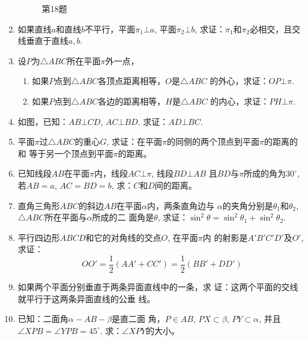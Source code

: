 \begin{enumerate}
\begin{figure}[htp]
\begin{minipage}[t]{0.48\textwidth}
\begin{tikzpicture}[>=latex, scale=1]
  \end{tikzpicture}
  \caption*{第18题}
  \end{minipage}
  \end{figure}

\item 如果直线$a$和直线$b$不平行，平面$\pi_1\bot a$, 平面$\pi_2\bot b$, 
求证：$\pi_1$和$\pi_2$必相交，且交线垂直于直线$a,b$.
\item 设$P$为$\triangle ABC$所在平面$\pi$外一点，
\begin{enumerate}
  \item 如果$P$点到$\triangle ABC$各顶点距离相等，$O$是$\triangle ABC$
的外心，求证：$OP\bot\pi$.
\item 如果$P$点到$\triangle ABC$各边的距离相等，$H$是$\triangle ABC$
的内心，求证：$PH\bot\pi$.
\end{enumerate}
\item 如图，已知：$AB\bot CD$, $AC\bot BD$. 
求证：$AD\bot BC$.
\item 平面$\pi$过$\triangle ABC$的重心$G$, 
求证：在平面$\pi$的同侧的两个顶点到平面$\pi$的距离的和
等于另一个顶点到平面$\pi$的距离。
\item 已知线段$AB$在平面$\pi$内，线段$AC\bot \pi$, 线段$BD\bot AB$
且$BD$与$\pi$所成的角为$30^{\circ}$, 若$AB=a$, $AC=BD=b$, 
求：$C$和$D$间的距离。
\item 直角三角形$ABC$的斜边$AB$在平面$\alpha$内，两条直角边与
$\alpha$的夹角分别是$\theta_1$和$\theta_2$, $\triangle ABC$所在平面与$\alpha$所成的二
面角是$\theta$, 求证：$\sin^2\theta=\sin^2\theta_1+\sin^2\theta_2$.
\item 平行四边形$ABCD$和它的对角线的交点$O$, 在平面$\pi$内
的射影是$A'B'C'D'$及$O'$, 求证：
\[OO'=\frac{1}{2}(AA'+CC')= \frac{1}{2}(BB'+DD')\]
\item 如果两个平面分别垂直于两条异面直线中的一条，求
证：这两个平面的交线就平行于这两条异面直线的公垂
线。
\item 已知：二面角$\alpha-AB-\beta$是直二面
角，$P\in AB$, $PX\subset \beta$, $PY\subset \alpha$, 并且
$\angle XPB=\angle YPB=45^{\circ}$. 
求：$\angle XPY$的大小。
\begin{figure}[htp]
  \centering
{}
\end{figure}
\end{enumerate}
